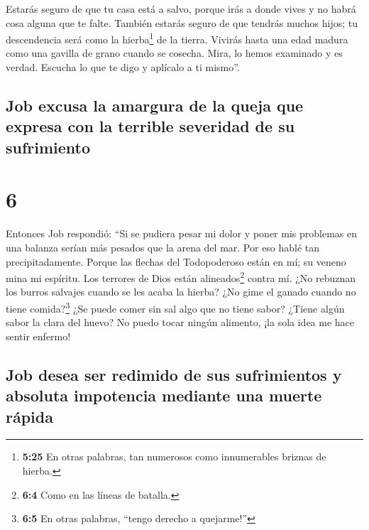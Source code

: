  Estarás seguro de que tu casa está a salvo, porque irás
a donde vives y no habrá cosa alguna que te falte. 
También estarás seguro de que tendrás muchos hijos; tu descendencia será
como la hierba\footnote{\textbf{5:25} En otras palabras, tan numerosos
  como innumerables briznas de hierba.} de la tierra. 
Vivirás hasta una edad madura como una gavilla de grano cuando se
cosecha.  Mira, lo hemos examinado y es verdad. Escucha
lo que te digo y aplícalo a ti mismo''.

\hypertarget{job-excusa-la-amargura-de-la-queja-que-expresa-con-la-terrible-severidad-de-su-sufrimiento}{%
\subsection{Job excusa la amargura de la queja que expresa con la
terrible severidad de su
sufrimiento}\label{job-excusa-la-amargura-de-la-queja-que-expresa-con-la-terrible-severidad-de-su-sufrimiento}}

\hypertarget{section-5}{%
\section{6}\label{section-5}}

 Entonces Job respondió:  ``Si se pudiera
pesar mi dolor y poner mis problemas en una balanza 
serían más pesados que la arena del mar. Por eso hablé tan
precipitadamente.  Porque las flechas del Todopoderoso
están en mí; su veneno mina mi espíritu. Los terrores de Dios están
alineados\footnote{\textbf{6:4} Como en las líneas de batalla.} contra
mí.  ¿No rebuznan los burros salvajes cuando se les acaba
la hierba? ¿No gime el ganado cuando no tiene comida?\footnote{\textbf{6:5}
  En otras palabras, ``tengo derecho a quejarme!''}  ¿Se
puede comer sin sal algo que no tiene sabor? ¿Tiene algún sabor la clara
del huevo?  No puedo tocar ningún alimento, ¡la sola idea
me hace sentir enfermo!

\hypertarget{job-desea-ser-redimido-de-sus-sufrimientos-y-absoluta-impotencia-mediante-una-muerte-ruxe1pida}{%
\subsection{Job desea ser redimido de sus sufrimientos y absoluta
impotencia mediante una muerte
rápida}\label{job-desea-ser-redimido-de-sus-sufrimientos-y-absoluta-impotencia-mediante-una-muerte-ruxe1pida}}

